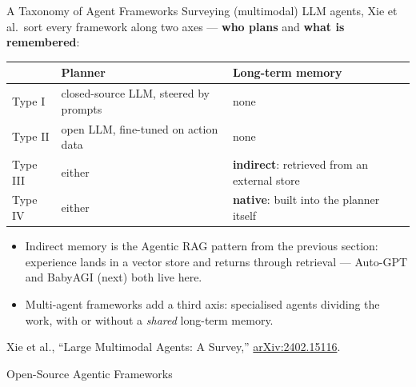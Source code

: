 \begin{frame}{A Taxonomy of Agent Frameworks}
  Surveying (multimodal) LLM agents, Xie et al.\ sort every framework along two axes --- \textbf{who plans}
  and \textbf{what is remembered}:
  \vspace{0.4em}
  \begin{center}
  {\footnotesize
  \begin{tabular}{lll}
    \toprule
    & Planner & Long-term memory \\
    \midrule
    Type I & closed-source LLM, steered by prompts & none \\
    Type II & open LLM, fine-tuned on action data & none \\
    Type III & either & \textbf{indirect}: retrieved from an external store \\
    Type IV & either & \textbf{native}: built into the planner itself \\
    \bottomrule
  \end{tabular}}
  \end{center}
  \vspace{0.4em}
  \begin{itemize}\itemsep0.3em
    \item[\textcolor{red}{$\triangleright$}] Indirect memory is the Agentic RAG pattern from the previous
      section: experience lands in a vector store and returns through retrieval --- Auto-GPT and BabyAGI
      (next) both live here.
    \item[\textcolor{red}{$\triangleright$}] Multi-agent frameworks add a third axis: specialised agents
      dividing the work, with or without a \emph{shared} long-term memory.
  \end{itemize}
  \vspace{0.2em}
  {\scriptsize Xie et al., ``Large Multimodal Agents: A Survey,''
  \href{https://arxiv.org/abs/2402.15116}{arXiv:2402.15116}.}
\end{frame}

\begin{frame}{}
  \LARGE Open-Source Agentic Frameworks
\end{frame}

